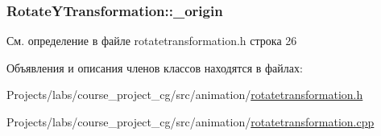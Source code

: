 \subsubsection[{\texorpdfstring{\+\_\+origin}{_origin}}]{ Rotate\+Y\+Transformation\+::\+\_\+origin\hspace{0.3cm}{\ttfamily [protected]}}\hypertarget{class_rotate_y_transformation_a682b5e9e50be3147831198697c449733}{}\label{class_rotate_y_transformation_a682b5e9e50be3147831198697c449733}


См. определение в файле rotatetransformation.\+h строка 26



Объявления и описания членов классов находятся в файлах\+:\begin{DoxyCompactItemize}
\item 
Projects/labs/course\+\_\+project\+\_\+cg/src/animation/\hyperlink{rotatetransformation_8h}{rotatetransformation.\+h}\item 
Projects/labs/course\+\_\+project\+\_\+cg/src/animation/\hyperlink{rotatetransformation_8cpp}{rotatetransformation.\+cpp}\end{DoxyCompactItemize}
